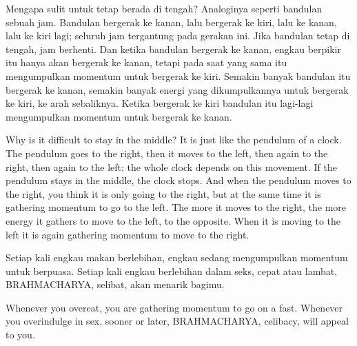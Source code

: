 \bahasa
Mengapa sulit untuk tetap berada di tengah? Analoginya seperti bandulan sebuah jam. Bandulan bergerak ke kanan, lalu bergerak ke kiri, lalu ke kanan, lalu ke kiri lagi; seluruh jam tergantung pada gerakan ini. Jika bandulan tetap di tengah, jam berhenti. Dan ketika bandulan bergerak ke kanan, engkau berpikir itu hanya akan bergerak ke kanan, tetapi pada saat yang sama itu mengumpulkan momentum untuk bergerak ke kiri. Semakin banyak bandulan itu bergerak ke kanan, semakin banyak energi yang dikumpulkannya untuk bergerak ke kiri, ke arah sebaliknya. Ketika bergerak ke kiri bandulan itu lagi-lagi mengumpulkan momentum untuk bergerak ke kanan.

\english
Why is it difficult to stay in the middle? It is just like the pendulum of a clock. The pendulum goes to the right, then it moves to the left, then again to the right, then again to the left; the whole clock depends on this movement. If the pendulum stays in the middle, the clock stops. And when the pendulum moves to the right, you think it is only going to the right, but at the same time it is gathering momentum to go to the left. The more it moves to the right, the more energy it gathers to move to the left, to the opposite. When it is moving to the left it is again gathering momentum to move to the right.

\bahasa
Setiap kali engkau makan berlebihan, engkau sedang mengumpulkan momentum untuk berpuasa. Setiap kali engkau berlebihan dalam seks, cepat atau lambat, BRAHMACHARYA, selibat, akan menarik bagimu.

\english
Whenever you overeat, you are gathering momentum to go on a fast. Whenever you overindulge in sex, sooner or later, BRAHMACHARYA, celibacy, will appeal to you.









